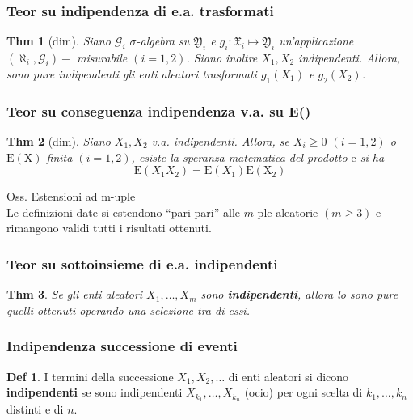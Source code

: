 \documentclass[a4paper,11pt]{article}
\theoremstyle{plain}
\newtheorem{thm}{Thm}[section]
\theoremstyle{definition}
\newtheorem{defn}{Def}[section]
\theoremstyle{remark}
\begin{document}
\subsubsection{Teor su  indipendenza di e.a. trasformati}
\begin{thm}[dim]
Siano $\mathcal{G}_{i}$ $\sigma$-algebra su $\mathfrak{Y}_{i}$ e $g_{i}: \mathfrak{X}_{i}\mapsto \mathfrak{Y}_{i}$ un'applicazione $(\aleph_{i}, \mathcal{G}_{i})-$ misurabile $(i=1,2)$. Siano inoltre $X_{1}, X_{2}$ indipendenti. Allora, sono pure indipendenti gli enti aleatori trasformati $g_{1}(X_{1})$ e $g_{2}(X_{2})$.
\end{thm}

\subsubsection{Teor su conseguenza  indipendenza v.a. su E()}
\begin{thm} [dim] Siano $X_{1}, X_{2}$ v.a. indipendenti. Allora, se $X_{i}\geq 0$ $ (i=1,2)$ o  $\mathrm{E}(\mathrm{X})$ finita $(i=1,2)$, esiste la speranza matematica del prodotto $\mathrm{e}$ si ha
$$
\mathrm{E}(X_{1}X_{2})=\mathrm{E}(X_{1})\mathrm{E}(\mathrm{X}_2)
$$
\end{thm} 

\noindent
Oss. Estensioni ad m-uple\\
Le definizioni date si estendono ``pari pari'' alle $m$-ple aleatorie $(m\geq 3)$ e rimangono validi tutti $\mathrm{i}$ risultati ottenuti.

\subsubsection{Teor su sottoinsieme di e.a. indipendenti}
\begin{thm}
Se gli enti aleatori $X_{1}, \ldots, X_{m}$ sono \textbf{indipendenti}, allora lo sono pure quelli ottenuti operando una selezione tra di essi. 
\end{thm}

\subsubsection{Indipendenza successione di eventi}
\begin{defn}
I termini della successione $X_{1}, X_{2}, \ldots$ di enti aleatori si dicono \textbf{indipendenti} se sono indipendenti $X_{k_{1}}, \ldots, X_{k_{n}}$ (ocio) per ogni scelta di $k_{1}, \ldots, k_{n}$ distinti $\mathrm{e}$ di $n.$
\end{defn}
\end{document}
